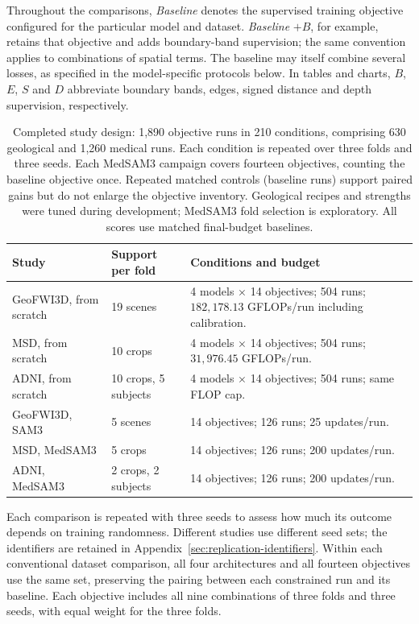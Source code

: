 \documentclass[12pt,a4paper]{article}
\begin{document}
Throughout the comparisons, \emph{Baseline} denotes the supervised training
objective configured for the particular model and dataset. \emph{Baseline}
$+B$, for example, retains that objective and adds boundary-band
supervision; the same convention applies to combinations of spatial terms.
The baseline may itself combine several losses, as specified in the
model-specific protocols below. In tables and charts, $B$, $E$, $S$ and $D$
abbreviate boundary bands, edges, signed distance and depth supervision,
respectively.

\begin{table}[htbp]
\centering\small{}
\begin{tabular}{@{}P{3.1cm}P{3.0cm}P{8.8cm}@{}}
\hline
Study & Support per fold & Conditions and budget \\
\hline
GeoFWI3D, from scratch & 19 scenes & 4 models $\times$ 14 objectives; 504 runs; $182{,}178.13$ GFLOPs/run including calibration. \\[.5em]
MSD, from scratch & 10 crops & 4 models $\times$ 14 objectives; 504 runs; $31{,}976.45$ GFLOPs/run. \\[.5em]
ADNI, from scratch & 10 crops, 5 subjects & 4 models $\times$ 14 objectives; 504 runs; same FLOP cap. \\[.5em]
GeoFWI3D, SAM3 & 5 scenes & 14 objectives; 126 runs; 25 updates/run. \\[.5em]
MSD, MedSAM3 & 5 crops & 14 objectives; 126 runs; 200 updates/run. \\[.5em]
ADNI, MedSAM3 & 2 crops, 2 subjects & 14 objectives; 126 runs; 200 updates/run. \\
\hline
\end{tabular}
\caption{Completed study design: 1,890 objective runs in 210 conditions,
comprising 630 geological and 1,260 medical runs. Each condition is
repeated over three folds and three seeds.
Each MedSAM3 campaign covers fourteen objectives, counting the baseline
objective once. Repeated matched controls (baseline runs) support paired gains but do
not enlarge the objective inventory.
Geological recipes and strengths were tuned during development;
MedSAM3 fold selection is exploratory.
All scores use matched final-budget baselines.}
\label{tab:experimental-design}
\end{table}

Each comparison is repeated with three seeds to assess how much its
outcome depends on training randomness. Different studies use different
seed sets; the identifiers are retained in
Appendix~\ref{sec:replication-identifiers}. Within
each conventional dataset comparison, all four architectures and all
fourteen objectives use the same set, preserving the pairing between
each constrained run and its baseline. Each objective includes all nine
combinations of three folds and three seeds, with equal weight for the
three folds.
\end{document}
